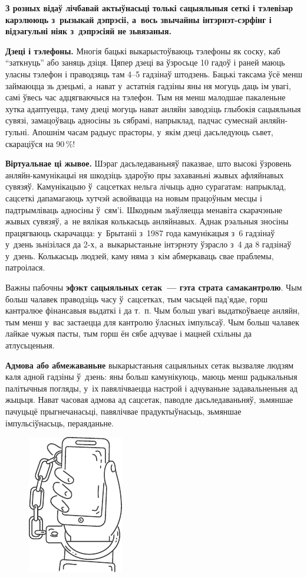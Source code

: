 \textbf{З розных відаў лічбавай актыўнасьці толькі сацыяльныя сеткі і тэлевізар карэлююць з~рызыкай дэпрэсіі, а~вось звычайны інтэрнэт-сэрфінг і відэагульні ніяк з~дэпрэсіяй не зьвязаныя.}

\textbf{Дзеці і тэлефоны.} Многія бацькі выкарыстоўваюць тэлефоны як соску, каб ``заткнуць'' або заняць дзіця. Цяпер дзеці ва ўзросьце 10 гадоў і раней маюць уласны тэлефон і праводзяць там 4--5 гадзінаў штодзень. Бацькі таксама ўсё менш займаюцца зь дзецьмі, а~нават у~астатнія гадзіны яны ня могуць даць ім увагі, самі ўвесь час адцягваючыся на тэлефон. Тым ня менш малодшае пакаленьне хутка адаптуецца, таму дзеці могуць нават анляйн заводзіць глыбокія сацыяльныя сувязі, замацоўваць адносіны зь сябрамі, напрыклад, падчас сумеснай анляйн-гульні. Апошнім часам радыус прасторы, у~якім дзеці дасьледуюць сьвет, скараціўся на 90\,\%!

\textbf{Віртуальнае ці жывое.} Шэраг дасьледаваньняў паказвае, што высокі ўзровень анляйн-камунікацыі ня шкодзіць здароўю пры захаваньні жывых афляйнавых сувязяў. Камунікацыю ў~сацсетках нельга лічыць адно сурагатам: напрыклад, сацсеткі дапамагаюць хутчэй асвойвацца на новым працоўным месцы і падтрымліваць адносіны ў~сям'і. Шкодным зьяўляецца менавіта скарачэньне жывых сувязяў, а~не вялікая колькасьць анляйнавых. Аднак рэальныя зносіны працягваюць скарачацца: у~Брытаніі з~1987 года камунікацыя з~6 гадзінаў у~дзень зьнізілася да 2-х, а~выкарыстаньне інтэрнэту ўзрасло з~4 да 8 гадзінаў у~дзень. Колькасьць людзей, каму няма з~кім абмеркаваць свае праблемы, патроілася.

Важны пабочны \textbf{эфэкт сацыяльных сетак~--- гэта страта самакантролю}. Чым больш чалавек праводзіць часу ў~сацсетках, тым часьцей пад'ядае, горш кантралюе фінансавыя выдаткі і да т.~п. Чым больш увагі выдаткоўваеце анляйн, тым менш у~вас застаецца для кантролю ўласных імпульсаў. Чым больш чалавек лайкае чужыя пасты, тым горш ён сябе адчувае і мацней схільны да атлусьценьня.

\textbf{Адмова або абмежаваньне} выкарыстаньня сацыяльных сетак вызваляе людзям каля адной гадзіны ў~дзень: яны больш камунікуюць, маюць менш радыкальныя палітычныя погляды, у~іх павялічваецца настрой і адчуваньне задавальненьня ад жыцьця. Нават часовая адмова ад сацсетак, паводле дасьледаваньняў, зьмяншае пачуцьцё прыгнечанасьці, павялічвае прадуктыўнасьць, зьмяншае імпульсіўнасьць, пераяданьне.

\begin{figure}[htb!]
  \centering
  \includegraphics[scale=1.5]{willpower/ch13/3.pdf}
\end{figure}

